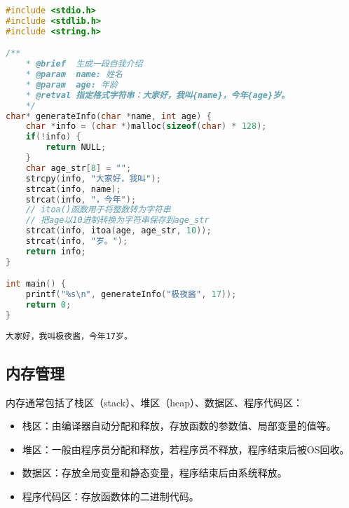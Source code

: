 \vspace{0.5cm}


\begin{lstlisting}[language=C]
#include <stdio.h>
#include <stdlib.h>
#include <string.h>

/**
    * @brief  生成一段自我介绍
    * @param  name: 姓名
    * @param  age: 年龄
    * @retval 指定格式字符串：大家好，我叫{name}，今年{age}岁。
    */
char* generateInfo(char *name, int age) {
    char *info = (char *)malloc(sizeof(char) * 128);
    if(!info) {
        return NULL;
    }
    char age_str[8] = "";
    strcpy(info, "大家好，我叫");
    strcat(info, name);
    strcat(info, "，今年");
    // itoa()函数用于将整数转为字符串
    // 把age以10进制转换为字符串保存到age_str
    strcat(info, itoa(age, age_str, 10));
    strcat(info, "岁。");
    return info;
}

int main() {
    printf("%s\n", generateInfo("极夜酱", 17));
    return 0;
}
\end{lstlisting}

\begin{tcolorbox}
    \begin{verbatim}
大家好，我叫极夜酱，今年17岁。
	\end{verbatim}
\end{tcolorbox}

\vspace{0.5cm}

\subsection{内存管理}

内存通常包括了栈区（stack）、堆区（heap）、数据区、程序代码区：

\begin{itemize}
    \item 栈区：由编译器自动分配和释放，存放函数的参数值、局部变量的值等。

    \item 堆区：一般由程序员分配和释放，若程序员不释放，程序结束后被OS回收。

    \item 数据区：存放全局变量和静态变量，程序结束后由系统释放。

    \item 程序代码区：存放函数体的二进制代码。
\end{itemize}

